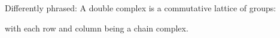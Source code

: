 Differently phrased: A double complex is a commutative lattice of groups:
\begin{center}
\end{center}
with each row and column being a chain complex.

